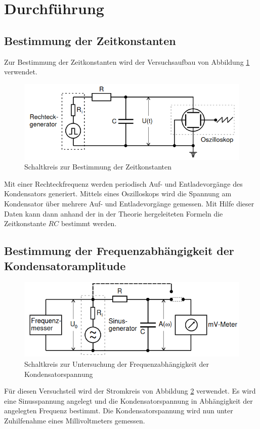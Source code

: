 \section{Durchführung}
\label{sec:Durchführung}

\subsection{Bestimmung der Zeitkonstanten}
    Zur Bestimmung der Zeitkonstanten wird der Versuchsaufbau von Abbildung \ref{fig:schalt2} verwendet.
    \begin{figure}
        \centering
        \includegraphics{schalt2.png}
        \caption{Schaltkreis zur Bestimmung der Zeitkonstanten}
        \label{fig:schalt2}
      \end{figure}
    Mit einer Rechteckfrequenz werden periodisch Auf- und Entladevorgänge des Kondensators 
    generiert. Mittels eines Oszilloskops wird die Spannung am Kondensator über mehrere
    Auf- und Entladevorgänge gemessen. Mit Hilfe dieser Daten kann dann anhand der in der 
    Theorie hergeleiteten Formeln die Zeitkonstante $RC$ bestimmt werden. 

\subsection{Bestimmung der Frequenzabhängigkeit der Kondensatoramplitude}
    \begin{figure}
        \centering
        \includegraphics{schalt4.png}
        \caption{Schaltkreis zur Untersuchung der Frequenzabhängigkeit der Kondensatorspannung}
        \label{fig:schalt4}
    \end{figure}
    Für diesen Versuchsteil wird der Stromkreis von Abbildung \ref{fig:schalt4} verwendet. Es wird
    eine Sinusspannung angelegt und die Kondensatorspannung in Abhängigkeit der angelegten
    Frequenz bestimmt. Die Kondensatorspannung wird nun unter Zuhilfenahme eines 
    Millivoltmeters gemessen.

